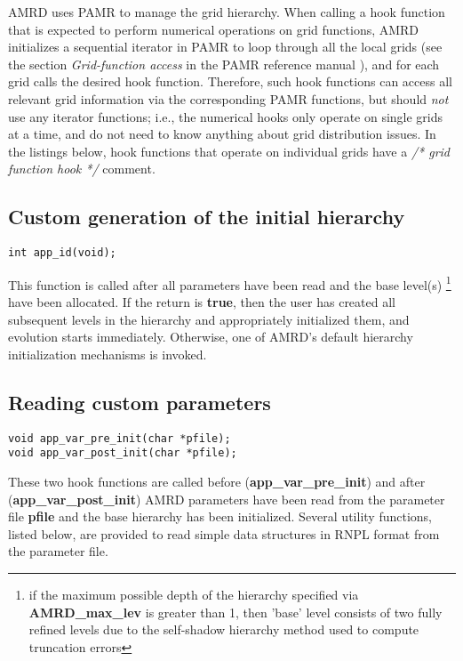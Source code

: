 \documentclass[aps,amssymb,unsortedaddress,nofootinbib]{revtex4}
\begin{document}
AMRD uses PAMR to manage the grid hierarchy. When calling a hook function
that is expected to perform numerical operations on grid functions, AMRD initializes
a sequential iterator in PAMR to loop through all the local grids (see the section
{\em Grid-function access} in the PAMR reference manual \cite{pamr}), and
for each grid calls the desired hook function. Therefore, such hook functions
can access all relevant grid information via the corresponding PAMR functions,
but should {\em not} use any iterator functions; i.e., the numerical hooks
only operate on single grids at a time, and do not need to know 
anything about grid distribution issues.
In the listings below, hook functions that operate on individual grids
have a {\em /* grid function hook */} comment.

\subsection{Custom generation of the initial hierarchy}

\begin{verbatim}
int app_id(void);
\end{verbatim}

This function is called after all parameters have been read
and the base level(s) \footnote{if the maximum possible 
depth of the hierarchy specified via {\bf AMRD\_max\_lev} is greater than 1,
then 'base' level consists of two fully refined levels due to
the self-shadow hierarchy method used to compute truncation errors}
have been allocated.
If the return is {\bf true}, then the user has created all subsequent
levels in the hierarchy and appropriately initialized them, 
and evolution starts immediately. Otherwise, one of AMRD's default
hierarchy initialization mechanisms is invoked.

\subsection{Reading custom parameters}

\begin{verbatim}
void app_var_pre_init(char *pfile);
void app_var_post_init(char *pfile);
\end{verbatim}

These two hook functions are called before ({\bf app\_var\_pre\_init})
and after ({\bf app\_var\_post\_init}) AMRD parameters have
been read from the parameter file {\bf pfile} and the base hierarchy 
has been initialized. Several utility functions, listed below, 
are provided to read simple data structures in RNPL format \cite{rnpl} 
from the parameter file.
\end{document}
